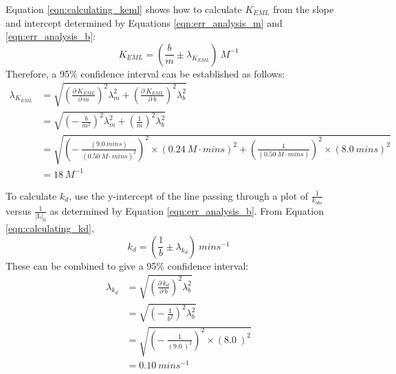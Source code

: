 Equation \eqref{eqn:calculating_keml} shows how to calculate $K_{EML}$ from the slope and intercept determined by Equations \eqref{eqn:err_analysis_m} and \eqref{eqn:err_analysis_b}:
\begin{equation*}
K_{EML}=\left (\frac{b}{m}\pm\lambda_{K_{EML}}\right ){\ }M^{-1}
\end{equation*}
Therefore, a 95\% confidence interval can be established as follows:
\begin{equation}\label{eqn:err_anal_keml}
\begin{split}
\lambda_{K_{EML}}&=\sqrt{\left (\frac{\partial{\ }K_{EML}}{\partial{\ }m}\right )^{2}\lambda_{m}^{2}+\left (\frac{\partial{\ }K_{EML}}{\partial{\ }b}\right )^{2}\lambda_{b}^{2}} \\
&=\sqrt{\left (-{\ }\frac{b}{m^{2}}\right )^{2}\lambda_{m}^{2}+\left (\frac{1}{m}\right )^{2}\lambda_{b}^{2}} \\
&=\sqrt{\left (-{\ }\frac{\left (9.0{\ }mins\right )}{\left (0.50{\ }M\cdot{mins}\right )^{2}}\right )^2\times\left (0.24{\ }M\cdot{mins}\right )^2+\left (\frac{1}{\left (0.50{\ }M\cdot{mins}\right )}\right )^2\times\left (8.0{\ }mins\right )^2} \\
&=18\ M^{-1}
\end{split}
\end{equation}

To calculate $k_d$, use the y-intercept of the line passing through a plot of $\frac{1}{k_{obs}}$ versus $\frac{1}{\text{[L]}_0}$ as determined by Equation \eqref{eqn:err_analysis_b}. From Equation \eqref{eqn:calculating_kd},
\begin{equation*}
k_{d}=\left (\frac{1}{b}\pm\lambda_{k_{d}}\right ){\ }mins^{-1}
\end{equation*}
These can be combined to give a 95\% confidence interval:
\begin{equation}\label{eqn:err_anal_kd}
\begin{split}
\lambda_{k_{d}}&=\sqrt{\left (\frac{\partial{\ }k_{d}}{\partial{\ }b}\right )^{2}\lambda_{b}^{2}}\\
&=\sqrt{\left (-{\ }\frac{1}{b^{2}}\right )^{2}\lambda_{b}^{2}}\\
&=\sqrt{\left (-{\ }\frac{1}{\left (9.0{\ }\right )^{2}}\right )^2\times\left (8.0{\ }\right )^2}\\
&=0.10\ mins^{-1}
\end{split}
\end{equation}
